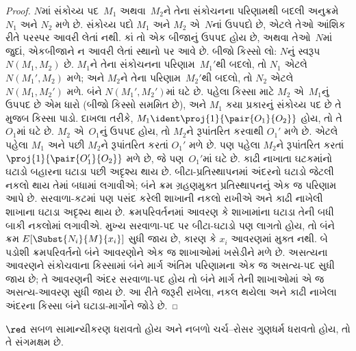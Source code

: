\begin{proof}
  $N$માં સંકોચ્ય પદ~$M_1$ અથવા~$M_2$ને
  તેના સંકોચનના પરિણામથી બદલી અનુક્રમે
  $N_1$ અને $N_2$ મળે છે. સંકોચ્ય પદો
  $M_1$ અને $M_2$ એ~$N$નાં ઉપપદો છે,
  એટલે તેઓ આંશિક રીતે પરસ્પર આવરી લેતાં નથી.
  કાં તો એક બીજાનું ઉપપદ હોય છે, અથવા
  તેઓ~$N$માં જુદાં, એકબીજાને ન આવરી લેતાં
  સ્થાનો પર આવે છે. બીજો કિસ્સો લો:
  $N$નું સ્વરૂપ $N(M_1,M_2)$ છે.
  $M_1$ને તેના સંકોચનના પરિણામ~$M_1'$થી
  બદલો, તો $N_1$ એટલે $N(M_1',M_2)$
  મળે; અને $M_2$ને તેના પરિણામ~$M_2'$થી
  બદલો, તો $N_2$ એટલે $N(M_1,M_2')$
  મળે. બંને $N(M_1',M_2')$માં ઘટે છે.
  પહેલા કિસ્સા માટે $M_2$ એ~$M_1$નું
  ઉપપદ છે એમ ધારો (બીજો કિસ્સો સમમિત છે),
  અને $M_1$ કયા પ્રકારનું સંકોચ્ય પદ છે
  તે મુજબ કિસ્સા પાડો. દાખલા તરીકે,
  $M_1 \ident \proj{1}{\pair{O_1}{O_2}}$
  હોય, તો તે $O_1$માં ઘટે છે. $M_2$
  એ~$O_1$નું ઉપપદ હોય, તો $M_2$ને
  રૂપાંતરિત કરવાથી $O_1'$ મળે છે.
  એટલે પહેલા $M_1$ અને પછી $M_2$ને
  રૂપાંતરિત કરતાં $O_1'$ મળે છે.
  પણ પહેલા $M_2$ને રૂપાંતરિત કરતાં
  $\proj{1}{\pair{O_1'}{O_2}}$ મળે છે,
  જે પણ~$O_1'$માં ઘટે છે.
  કાઢી નાખાતા ઘટકમાંનો ઘટાડો બહારના ઘટાડા પછી
  અદૃશ્ય થાય છે. બીટા-પ્રતિસ્થાપનમાં અંદરનો ઘટાડો
  જેટલી નકલો થાય તેમાં બધામાં લગાવીએ; બંને ક્રમ
  ગ્રહણમુક્ત પ્રતિસ્થાપનનું એક જ પરિણામ આપે છે.
  સરવાળા-કટમાં પણ પસંદ કરેલી શાખાની નકલો રાખીએ
  અને કાઢી નાખેલી શાખાના ઘટાડા અદૃશ્ય થાય છે.
  ક્રમપરિવર્તનમાં આવરણ કે શાખામાંના ઘટાડા તેની
  બધી બાકી નકલોમાં લગાવીએ. મુખ્ય સરવાળા-પદ પર
  બીટા-ઘટાડો પણ લાગતો હોય, તો બંને ક્રમ
  $E[\Subst{N_i}{M}{x_i}]$ સુધી જાય છે, કારણ કે
  $x_i$ આવરણમાં મુક્ત નથી. બે પડોશી ક્રમપરિવર્તનો
  બંને આવરણોને એક જ શાખાઓમાં ખસેડીને મળે છે.
  અસત્યના આવરણને સંકોચવાના કિસ્સામાં બંને માર્ગ
  અંતિમ પરિણામના એક જ અસત્ય-પદ સુધી જાય છે;
  તે આવરણની અંદર સરવાળા-પદ હોય તો બંને માર્ગ
  તેની શાખાઓમાં એ જ અસત્ય-આવરણ સુધી જાય છે.
  આ રીતે જરૂરી રાખેલા, નકલ થયેલા અને કાઢી નાખેલા
  અંદરના કિસ્સા બંને ઘટાડા-માર્ગોને જોડે છે.
  
\end{proof}

\begin{lem}
$\red$ સબળ સામાન્યીકરણ ધરાવતો હોય અને નબળો
ચર્ચ--રોસર ગુણધર્મ ધરાવતો હોય, તો તે સંગમક્ષમ છે.
\end{lem}

